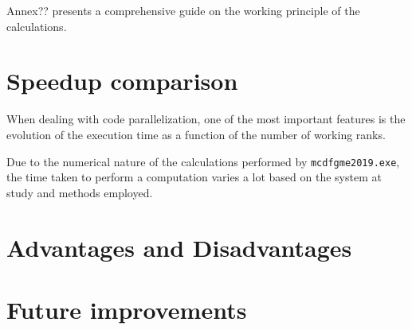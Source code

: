 Annex?? presents a comprehensive guide on the working principle of the calculations. 


\section{Speedup comparison}

When dealing with code parallelization, one of the most important features is the evolution of the execution time as a function of the number of working ranks.

Due to the numerical nature of the calculations performed by \verb|mcdfgme2019.exe|, the time taken to perform a computation varies a lot based on the system at study and methods employed.

\section{Advantages and Disadvantages}



\section{Future improvements}
